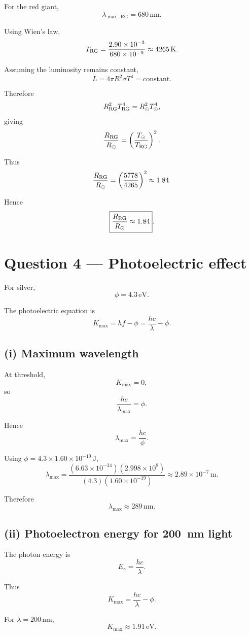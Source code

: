 \documentclass[11pt,a4paper]{article}
\begin{document}
For the red giant,
\[
\lambda_{\max,\mathrm{RG}}=680\,\mathrm{nm}.
\]

Using Wien's law,
\[
T_{\rm RG}
=
\frac{2.90\times10^{-3}}
{680\times10^{-9}}
\approx4265\,\mathrm K.
\]

Assuming the luminosity remains constant,
\[
L=4\pi R^2\sigma T^4=\text{constant}.
\]

Therefore
\[
R_{\rm RG}^2T_{\rm RG}^4
=
R_\odot^2T_\odot^4,
\]
giving
\[
\frac{R_{\rm RG}}{R_\odot}
=
\left(\frac{T_\odot}{T_{\rm RG}}\right)^2.
\]

Thus
\[
\frac{R_{\rm RG}}{R_\odot}
=
\left(\frac{5778}{4265}\right)^2
\approx1.84.
\]

Hence
\[
\boxed{\frac{R_{\rm RG}}{R_\odot}\approx1.84}.
\]

\section{Question 4 --- Photoelectric effect}

For silver,
\[
\phi=4.3\,\mathrm{eV}.
\]

The photoelectric equation is
\[
K_{\max}=hf-\phi
=
\frac{hc}{\lambda}-\phi.
\]

\subsection{(i) Maximum wavelength}

At threshold,
\[
K_{\max}=0,
\]
so
\[
\frac{hc}{\lambda_{\max}}=\phi.
\]

Hence
\[
\lambda_{\max}
=
\frac{hc}{\phi}.
\]

Using $\phi=4.3\times1.60\times10^{-19}\,\mathrm J$,
\[
\lambda_{\max}
=
\frac{(6.63\times10^{-34})(2.998\times10^8)}
{(4.3)(1.60\times10^{-19})}
\approx2.89\times10^{-7}\,\mathrm m.
\]

Therefore
\[
\boxed{\lambda_{\max}\approx289\,\mathrm{nm}}.
\]

\subsection{(ii) Photoelectron energy for \SI{200}{nm} light}

The photon energy is
\[
E_\gamma=\frac{hc}{\lambda}.
\]

Thus
\[
K_{\max}
=
\frac{hc}{\lambda}-\phi.
\]

For $\lambda=200\,\mathrm{nm}$,
\[
K_{\max}
\approx1.91\,\mathrm{eV}.
\]
\end{document}
